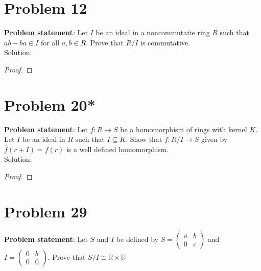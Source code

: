 \documentclass{article} %
\begin{document}
\section*{Problem 12}


\textbf{Problem statement}: Let $I$ be an ideal in a noncommutatie ring $R$ such that $ab - ba \in I$ for all $a, b \in R$.  Prove that $R/I$ is commutative.
\\

Solution: 
\begin{addmargin}[1em]{0em}
\begin{proof}

\end{proof}
\end{addmargin}

\newpage

\section*{Problem 20*}


\textbf{Problem statement}: Let $f: R \rightarrow S$ be a homomorphism of rings with kernel $K$.  Let $I$ be an ideal in $R$ such that $I \subseteq K$.  Show that $\bar{f}: R/I \rightarrow S$ given by $\bar{f}(r + I) = f(r)$ is a well defined homomorphism.
\\

Solution: 
\begin{addmargin}[1em]{0em}
\begin{proof}

\end{proof}
\end{addmargin}

\newpage

\section*{Problem 29}


\textbf{Problem statement}: Let $S$ and $I$ be defined by $S = \left( \begin{matrix} a & b \\ 0 & c \end{matrix} \right)$ and $I = \left( \begin{matrix} 0 & b \\ 0 & 0 \end{matrix} \right)$.  Prove that $S/I \cong \mathbb{R} \times \mathbb{R}$
\\
\end{document}
